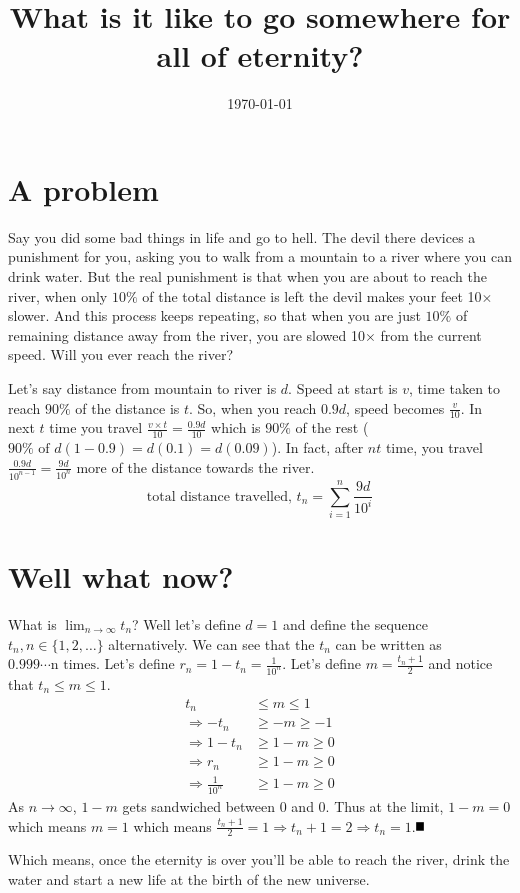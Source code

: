 \documentclass[11pt]{article}
\date{\today}
\title{What is it like to go somewhere for all of eternity?}
\newcommand{\qed}{\mbox{}\hspace*{\fill}\nolinebreak\mbox{$\rule{0.6em}{0.6em}$}}
\begin{document}
\maketitle
\section{A problem}
Say you did some bad things in life and go to hell. The devil there devices a
punishment for you, asking you to walk from a mountain to a river where you can
drink water. But the real punishment is that when you are about to reach the
river, when only \(10\%\) of the total distance is left the devil makes your
feet 10\(\times\) slower. And this process keeps repeating, so that when you are
just \(10\%\) of remaining distance away from the river, you are slowed
10\(\times\) from the current speed. Will you ever reach the river?
\par
Let's say distance from mountain to river is \(d\). Speed at start is \(v\),
time taken to reach \(90\%\) of the distance is \(t\). So, when you reach
\(0.9d\), speed becomes \(\frac{v}{10}\). In next \(t\) time you travel
\(\frac{v\times t}{10}=\frac{0.9d}{10}\) which is \(90\%\) of the rest (\(90\%
\text{ of }d(1-0.9)=d(0.1)=d(0.09)\)). In fact, after \(nt\) time, you travel
\(\frac{0.9d}{10^{n-1}}=\frac{9d}{10^n}\) more of the distance towards the river.
\[\text{total distance travelled, }t_n=\sum^n_{i=1}\frac{9d}{10^i}\]

\section{Well what now?}
What is \(\displaystyle\lim_{n\rightarrow\infty}t_n\)? Well let's define \(d=1\)
and define the sequence \(t_n, n\in\{1,2,\dotsc\}\) alternatively. We can see
that the \(t_n\) can be written as \(0.999\dotsm \text{n times}\). Let's define
\(r_n=1-t_n=\frac{1}{10^n}\). Let's define \(m=\frac{t_n+1}{2}\) and notice that
\(t_n\le m\le 1\).
\begin{align*}
    t_n&\le m\le 1\\
    \Rightarrow -t_n &\ge -m \ge -1 \\
    \Rightarrow 1-t_n&\ge 1-m \ge 0\\
    \Rightarrow r_n&\ge 1-m \ge 0 \\
    \Rightarrow \frac{1}{10^n}&\ge 1-m\ge 0
\end{align*}
As \(n\rightarrow\infty\), \(1-m\) gets sandwiched between 0 and 0. Thus at the
limit, \(1-m=0\) which means \(m=1\) which means \(\frac{t_n+1}{2}=1\Rightarrow
t_n+1=2\Rightarrow t_n=1\).\qed\par
Which means, once the eternity is over you'll be able to reach the river, drink
the water and start a new life at the birth of the new universe.
\end{document}
